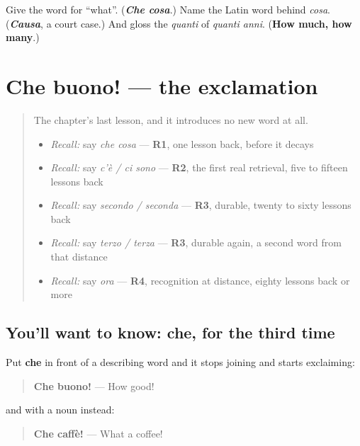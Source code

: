 \begin{tcolorbox}[breakable,colback=teal!4,colframe=teal!35!black,title={Before you move on}]
Give the word for \textquotedblleft{}what\textquotedblright{}. (\emph{\textbf{Che cosa}}.) Name the Latin word behind \emph{cosa}. (\emph{\textbf{Causa}}, a court case.) And gloss the \emph{quanti} of \emph{quanti anni}. (\textbf{How much, how many}.)
\end{tcolorbox}
\section[Che buono!]{Che buono! — the exclamation}

\label{lesson:IT-C31-che-buono}



\begin{quote}
The chapter's last lesson, and it introduces no new word at all.

\begin{itemize}
\raggedright
  \item \emph{Recall:} say \emph{che cosa} — \textbf{R1}, one lesson back, before it decays
  \item \emph{Recall:} say \emph{c'è / ci sono} — \textbf{R2}, the first real retrieval, five to fifteen lessons back
  \item \emph{Recall:} say \emph{secondo / seconda} — \textbf{R3}, durable, twenty to sixty lessons back
  \item \emph{Recall:} say \emph{terzo / terza} — \textbf{R3}, durable again, a second word from that distance
  \item \emph{Recall:} say \emph{ora} — \textbf{R4}, recognition at distance, eighty lessons back or more
\end{itemize}
\end{quote}

\subsection*{You'll want to know: che, for the third time}
Put \textbf{che} in front of a describing word and it stops joining and starts exclaiming:

\begin{quote}
\textbf{Che buono!} — How good!
\end{quote}

and with a noun instead:

\begin{quote}
\textbf{Che caffè!} — What a coffee!
\end{quote}

